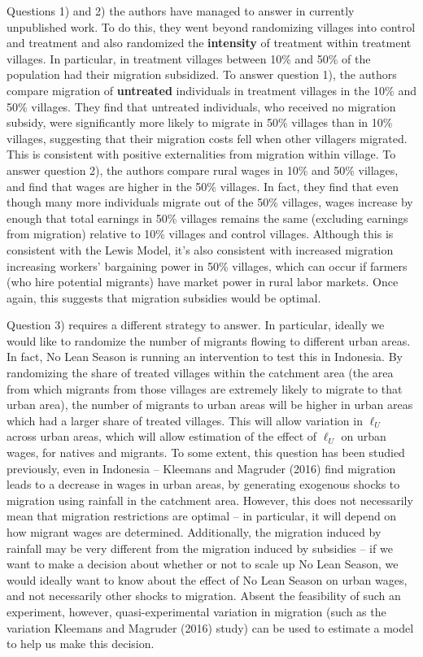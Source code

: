 \documentclass[12pt,english]{article}
\begin{document}
Questions 1) and 2) the authors have managed to answer in currently unpublished work. To do this, they went beyond randomizing villages into control and treatment and also randomized the \textbf{intensity} of treatment within treatment villages. In particular, in treatment villages between 10\% and 50\% of the population had their migration subsidized. To answer question 1), the authors compare migration of \textbf{untreated} individuals in treatment villages in the 10\% and 50\% villages. They find that untreated individuals, who received no migration subsidy, were significantly more likely to migrate in 50\% villages than in 10\% villages, suggesting that their migration costs fell when other villagers migrated. This is consistent with positive externalities from migration within village. To answer question 2), the authors compare rural wages in 10\% and 50\% villages, and find that wages are higher in the 50\% villages. In fact, they find that even though many more individuals migrate out of the 50\% villages, wages increase by enough that total earnings in 50\% villages remains the same (excluding earnings from migration) relative to 10\% villages and control villages. Although this is consistent with the Lewis Model, it's also consistent with increased migration increasing workers' bargaining power in 50\% villages, which can occur if farmers (who hire potential migrants) have market power in rural labor markets. Once again, this suggests that migration subsidies would be optimal.

Question 3) requires a different strategy to answer. In particular, ideally we would like to randomize the number of migrants flowing to different urban areas. In fact, No Lean Season is running an intervention to test this in Indonesia. By randomizing the share of treated villages within the catchment area (the area from which migrants from those villages are extremely likely to migrate to that urban area), the number of migrants to urban areas will be higher in urban areas which had a larger share of treated villages. This will allow variation in $\ell_{U}$ across urban areas, which will allow estimation of the effect of $\ell_{U}$ on urban wages, for natives and migrants. To some extent, this question has been studied previously, even in Indonesia -- Kleemans and Magruder (2016) find migration leads to a decrease in wages in urban areas, by generating exogenous shocks to migration using rainfall in the catchment area. However, this does not necessarily mean that migration restrictions are optimal -- in particular, it will depend on how migrant wages are determined. Additionally, the migration induced by rainfall may be very different from the migration induced by subsidies -- if we want to make a decision about whether or not to scale up No Lean Season, we would ideally want to know about the effect of No Lean Season on urban wages, and not necessarily other shocks to migration. Absent the feasibility of such an experiment, however, quasi-experimental variation in migration (such as the variation Kleemans and Magruder (2016) study) can be used to estimate a model to help us make this decision.
\end{document}
